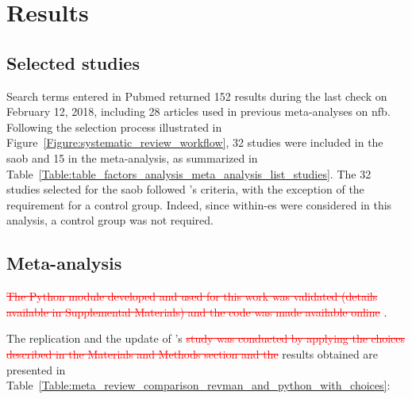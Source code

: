 


\section{Results}

\subsection{Selected studies}

Search terms entered in Pubmed returned 152 results during the last check on February 12, 2018, including 28 
articles used in previous meta-analyses on \gls{nfb}. Following the selection process illustrated 
in Figure~\ref{Figure:systematic_review_workflow}, 32 studies were included in the \gls{saob} and 15 in the meta-analysis, 
as summarized in Table~\ref{Table:table_factors_analysis_meta_analysis_list_studies}. The 32 studies selected for the \gls{saob} 
followed \citeauthor{Cortese2016}'s criteria, with the exception of the requirement for a control group. 
Indeed, since within-\gls{es} were considered in this analysis, a control group was not required.

\subsection{Meta-analysis}

\textcolor{red}{\sout{The Python module developed and used for this work was validated (details available in Supplemental Materials) 
and the code was made available online}} \citep{Bussalb2019}.

The replication and the update of \citeauthor{Cortese2016}'s \textcolor{red}{\sout{study was conducted by applying the choices described 
in the Materials and Methods section and the}} results obtained are presented 
in Table~\ref{Table:meta_review_comparison_revman_and_python_with_choices}:

